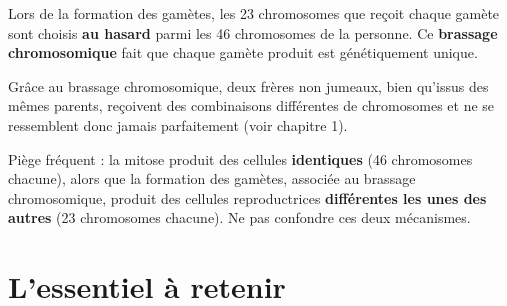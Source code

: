 \begin{illus}
\end{illus}

\begin{propriete}
Lors de la formation des gamètes, les 23 chromosomes que reçoit chaque gamète sont
choisis \textbf{au hasard} parmi les 46 chromosomes de la personne. Ce
\textbf{brassage chromosomique} fait que chaque gamète produit est génétiquement
unique.
\end{propriete}

\begin{exemple}
Grâce au brassage chromosomique, deux frères non jumeaux, bien qu'issus des mêmes
parents, reçoivent des combinaisons différentes de chromosomes et ne se ressemblent
donc jamais parfaitement (voir chapitre 1).
\end{exemple}

\begin{remarque}
Piège fréquent : la mitose produit des cellules \textbf{identiques} (46 chromosomes
chacune), alors que la formation des gamètes, associée au brassage chromosomique,
produit des cellules reproductrices \textbf{différentes les unes des autres} (23
chromosomes chacune). Ne pas confondre ces deux mécanismes.
\end{remarque}

\section{L'essentiel à retenir}

